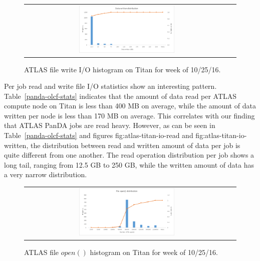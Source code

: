 \begin{figure}[!htb]
    \centering
    \begin{tabular}{cc}
        {\includegraphics[width=0.48\textwidth]{figures/panda_data_written_finer_hist.pdf}}\\
    \end{tabular}
    \caption{ATLAS file write I/O histogram on Titan for week of 10/25/16.}
\label{fig:atlas-titan-io-written}
\end{figure}

Per job read and write file I/O statistics show an interesting pattern.
Table~\ref{panda-olcf-stats} indicates that the amount of data read per ATLAS
compute node on Titan is less than 400 MB on average, while the amount of data
written per node is less than 170 MB on average. This correlates with our
finding that ATLAS PanDA jobs are read heavy. However, as can be seen in
Table~\ref{panda-olcf-stats} and figures {fig:atlas-titan-io-read} and
{fig:atlas-titan-io-written}, the distribution between read and written amount
of data per job is quite different from one another. The read operation
distribution per job shows a long tail, ranging from 12.5 GB to 250 GB, while
the written amount of data has a very narrow distribution.

\begin{figure}[!htb]
    \centering
    \begin{tabular}{cc}
        {\includegraphics[width=0.48\textwidth]{figures/panda_file_open_hist.pdf}}\\
    \end{tabular}
    \caption{ATLAS file $open()$ histogram on Titan for week of 10/25/16.}
\label{fig:atlas-titan-file-open}
\end{figure}

